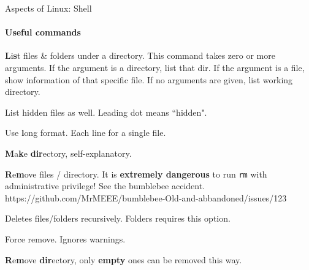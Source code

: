 \begin{frame}{Aspects of Linux: Shell}
\framesubtitle{Useful commands}
	\begin{description}[mkdir]
		\item[ls] \textbf{L}i\textbf{s}t files \& folders under a directory. This command takes zero or more arguments. If the argument is a directory, list that dir. If the argument is a file, show information of that specific file. If no arguments are given, list working directory.
		\begin{description}[-a]
			\small
			\item[-a] List hidden files as well. Leading dot means ``hidden".
			\item[-l] Use \textbf{l}ong format. Each line for a single file. 
		\end{description}
		\item[mkdir] \textbf{M}a\textbf{k}e \textbf{dir}ectory, self-explanatory.
		\item[rm] \textbf{R}e\textbf{m}ove files / directory. It is \textbf{extremely dangerous} to run \texttt{rm} with administrative privilege! See the bumblebee accident. \small{https://github.com/MrMEEE/bumblebee-Old-and-abbandoned/issues/123}
		\begin{description}[-a]
			\small
			\item[-r] Deletes files/folders recursively. Folders requires this option.
			\item[-f] Force remove. Ignores warnings.  
		\end{description}
		\item[rmdir] \textbf{R}e\textbf{m}ove \textbf{dir}ectory, only \textbf{empty} ones can be removed this way.
	\end{description}

\end{frame}

